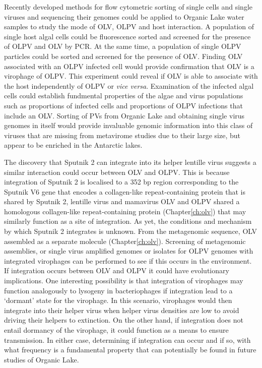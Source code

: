 Recently developed methods for flow cytometric sorting of single cells and single viruses and sequencing their genomes \cite{Martinez-Martinez2011, Allen2011} could be applied to Organic Lake water samples to study the mode of \ac{OLV}, \ac{OLPV} and host interaction.
A population of single host algal cells could be fluorescence sorted and screened for the presence of \ac{OLPV} and \ac{OLV} by \acs{PCR}.
At the same time, a population of single \ac{OLPV} particles could be sorted and screened for the presence of \ac{OLV}.
Finding \ac{OLV} associated with an \ac{OLPV} infected cell would provide confirmation that \ac{OLV} is a virophage of \ac{OLPV}.
This experiment could reveal if \ac{OLV} is able to associate with the host independently of \ac{OLPV} or \emph{vice versa}.
Examination of the infected algal cells could establish fundmental properties of the algae and virus populations such as proportions of infected cells and proportions of \ac{OLPV} infections that include an \ac{OLV}.
Sorting of \acp{PV} from Organic Lake and obtaining single virus genomes in itself would provide invaluable genomic information into this class of viruses that are missing from metavirome studies due to their large size, but appear to be enriched in the Antarctic lakes.

The discovery that Sputnik 2 can integrate into its helper lentille virus \cite{Desnues2012} suggests a similar interaction could occur between \ac{OLV} and \ac{OLPV}.
This is because integration of Sputnik 2 is localised to a 352 bp region corresponding to the Sputnik V6 gene that encodes a collagen-like repeat-containing protein that is shared by Sputnik 2, lentille virus and mamavirus  \cite{Desnues2012} 
\ac{OLV} and \ac{OLPV} shared a homologous collagen-like repeat-containing protein (Chapter\ref{ch:olv}) that may similarly function as a site of integration.
As yet, the conditions and mechanism by which Sputnik 2 integrates is unknown.
From the metagenomic sequence, \ac{OLV} assembled as a separate molecule (Chapter\ref{ch:olv}).
Screening of metagenomic assemblies, or single virus amplified genomes or isolates for {OLPV} genomes with integrated virophages can be performed to see if this occurs in the environment.
If integration occurs between \ac{OLV} and \ac{OLPV} it could have evolutionary implications.
One interesting possibility is that integration of virophages may function analogously to lysogeny in bacteriophages if integration lead to a `dormant' state for the virophage.
In this scenario, virophages would then integrate into their helper virus when helper virus densities are low to avoid driving their helpers to extinction.
On the other hand, if integration does not entail dormancy of the virophage, it could function as a means to ensure transmission.
In either case, determining if integration can occur and if so, with what frequency is a fundamental property that can potentially be found in future studies of Organic Lake.

